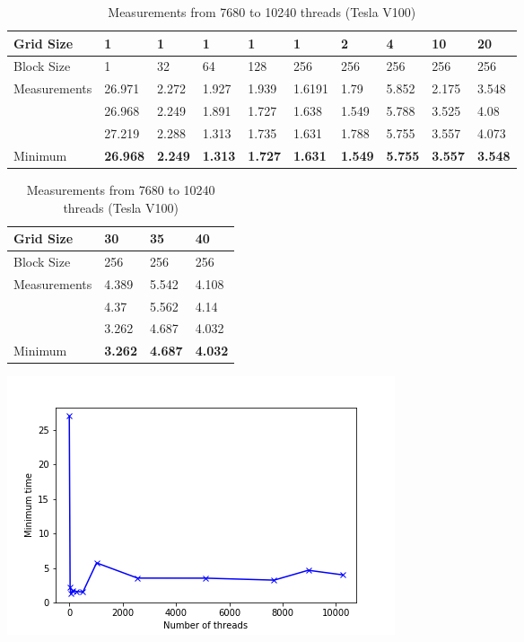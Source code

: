 \documentclass[12pt]{article}
\begin{document}
\begin{table}[]
\begin{center}
\begin{tabular}{|l|l|l|l|l|l|l|l|l|l|}
\hline
Grid Size & 1 & 1 & 1 & 1 & 1 & 2 & 4 & 10 & 20 \\ \hline
Block Size & 1 & 32 & 64 & 128 & 256 & 256 & 256 & 256 & 256 \\ \hline
Measurements & 26.971 & 2.272 & 1.927 & 1.939 & 1.6191 & 1.79 & 5.852 & 2.175 & 3.548 \\ \hline
 & 26.968 & 2.249 & 1.891 & 1.727 & 1.638 & 1.549 & 5.788 & 3.525 & 4.08 \\ \hline
 & 27.219 & 2.288 & 1.313 & 1.735 & 1.631 & 1.788 & 5.755 & 3.557 & 4.073 \\ \hline
Minimum & \textbf{26.968} & \textbf{2.249} & \textbf{1.313} & \textbf{1.727} & \textbf{1.631} & \textbf{1.549} & \textbf{5.755} & \textbf{3.557} & \textbf{3.548} \\ \hline
\end{tabular}
\end{center}
\caption{Measurements from 1 to 5120 threads (Tesla V100)}

\begin{center}
\begin{tabular}{|l|l|l|l|}
\hline
Grid Size & 30 & 35 & 40 \\ \hline
Block Size & 256 & 256 & 256 \\ \hline
Measurements & 4.389 & 5.542 & 4.108 \\ \hline
 & 4.37 & 5.562 & 4.14 \\ \hline
 & 3.262 & 4.687 & 4.032 \\ \hline
Minimum & \textbf{3.262} & \textbf{4.687} & \textbf{4.032} \\ \hline
\end{tabular}
\end{center}
\caption{Measurements from 7680 to 10240 threads (Tesla V100)}
\end{table}

\begin{center}
	\includegraphics[scale=0.9]{./images/tesla_threads_vs_time}
\end{center}
\end{document}
